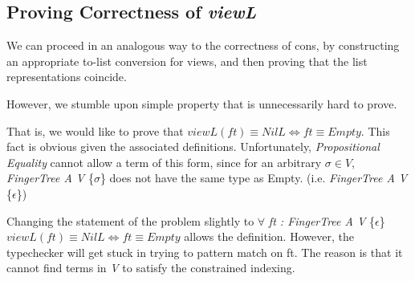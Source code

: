 \documentclass[12pt,twoside,notitlepage]{report}
\newcommand{\Conid}[1]{\mathit{#1}}
\newcommand{\Varid}[1]{\mathit{#1}}
\def\resethooks{%
  \global\let\SaveRestoreHook\empty
  \global\let\ColumnHook\empty}
\newcommand{\hsindent}[1]{\quad}%
\let\hspre\empty
\let\hspost\empty
\begin{document}
\subsection{Proving Correctness of \textit{viewL}}

We can proceed in an analogous way to the correctness of cons, by constructing an appropriate to-list conversion for views, and then proving that the list representations coincide.


However, we stumble upon simple property that is unnecessarily hard to prove.

That is, we would like to prove that $viewL(ft)\equiv NilL \iff ft \equiv Empty$. This fact is obvious given the associated definitions. Unfortunately, \textit{Propositional Equality} cannot allow a term of this form, since for an arbitrary $\sigma \in V$, \textit{FingerTree A V} \{$\sigma$\} does not have the same type as Empty. (i.e. \textit{FingerTree A V} \{$\epsilon$\})

Changing the statement of the problem slightly to $\forall$ \textit{ft : FingerTree A V} \{$\epsilon$\} $viewL(ft) \equiv NilL \iff ft \equiv Empty$ allows the definition. However, the typechecker will get stuck in trying to pattern match on ft. The reason is that it cannot find terms in \textit{V} to satisfy the constrained indexing.
\end{document}
